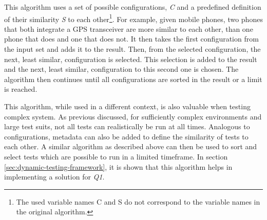 This algorithm uses a set of possible configurations, \textit{C} and a predefined definition of their similarity \textit{S} to each other\footnote{The used variable names C and S do not correspond to the variable names in the original algorithm.}.
For example, given mobile phones, two phones that both integrate a GPS transceiver are more similar to each other, than one phone that does and one that does not.
It then takes the first configuration from the input set and adds it to the result.
Then, from the selected configuration, the next, least similar, configuration is selected.
This selection is added to the result and the next, least similar, configuration to this second one is chosen.
The algorithm then continues until all configurations are sorted in the result or a limit is reached.

This algorithm, while used in a different context, is also valuable when testing complex system.
As previous discussed, for sufficiently complex environments and large test suits, not all tests can realistically be run at all times.
Analogous to configurations, metadata can also be added to define the similarity of tests to each other.
A similar algorithm as described above can then be used to sort and select tests which are possible to run in a limited timeframe.
In section \ref{sec:dynamic-testing-framework}, it is shown that this algorithm helps in implementing a solution for \textit{Q1}.

